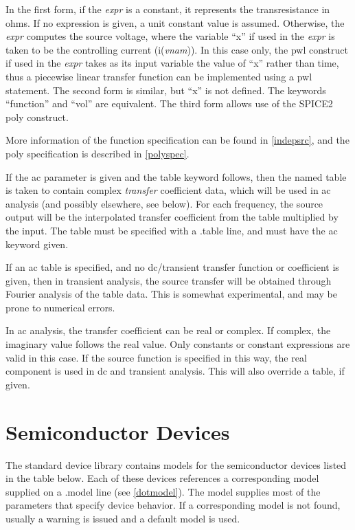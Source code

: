 In the first form, if the {\it expr} is a constant, it represents the
transresistance in ohms.  If no expression is given, a unit constant
value is assumed.  Otherwise, the {\it expr} computes the source
voltage, where the variable ``{\vt x}'' if used in the {\it expr} is
taken to be the controlling current (i({\it vnam\/})).  In this case
only, the {\vt pwl} construct if used in the {\it expr} takes as its
input variable the value of ``{\vt x}'' rather than time, thus a
piecewise linear transfer function can be implemented using a {\vt
pwl} statement.  The second form is similar, but ``{\vt x}'' is not
defined.  The keywords ``{\vt function}'' and ``{\vt vol}'' are
equivalent.  The third form allows use of the SPICE2 {\vt poly}
construct.

More information of the function specification can be found in
\ref{indepsrc}, and the {\vt poly} specification is described in
\ref{polyspec}.

If the {\vt ac} parameter is given and the {\vt table} keyword
follows, then the named table is taken to contain complex {\it
transfer} coefficient data, which will be used in ac analysis (and
possibly elsewhere, see below).  For each frequency, the source output
will be the interpolated transfer coefficient from the table
multiplied by the input.  The table must be specified with a {\vt
.table} line, and must have the {\vt ac} keyword given.

If an ac table is specified, and no dc/transient transfer function or
coefficient is given, then in transient analysis, the source transfer
will be obtained through Fourier analysis of the table data.  This is
somewhat experimental, and may be prone to numerical errors.

In ac analysis, the transfer coefficient can be real or complex.  If
complex, the imaginary value follows the real value.  Only constants
or constant expressions are valid in this case.  If the source
function is specified in this way, the real component is used in dc
and transient analysis.  This will also override a table, if given.


\section{Semiconductor Devices}


The standard {\WRspice} device library contains models for the
semiconductor devices listed in the table below.  Each of these
devices references a corresponding model supplied on a {\vt .model}
line (see \ref{dotmodel}).  The model supplies most of the parameters
that specify device behavior.  If a corresponding model is not found,
usually a warning is issued and a default model is used.

